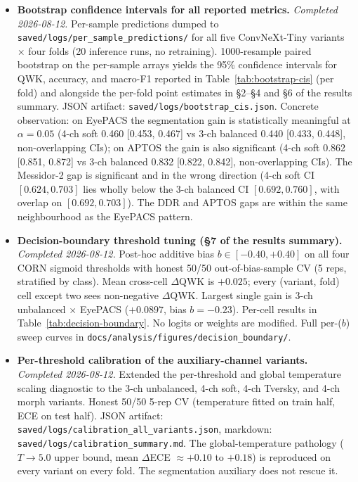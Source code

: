 \documentclass[11pt]{article}
\begin{document}
\begin{itemize}[leftmargin=*, topsep=0pt]
  \item \textbf{Bootstrap confidence intervals for all reported metrics.} \emph{Completed 2026-08-12.} Per-sample predictions dumped to \texttt{saved/logs/per\_sample\_predictions/} for all five ConvNeXt-Tiny variants $\times$ four folds (20 inference runs, no retraining). 1000-resample paired bootstrap on the per-sample arrays yields the 95\% confidence intervals for QWK, accuracy, and macro-F1 reported in Table~\ref{tab:bootstrap-cis} (per fold) and alongside the per-fold point estimates in §2--§4 and §6 of the results summary. JSON artifact: \texttt{saved/logs/bootstrap\_cis.json}. Concrete observation: on EyePACS the segmentation gain is statistically meaningful at $\alpha = 0.05$ (4-ch soft 0.460 [0.453, 0.467] vs 3-ch balanced 0.440 [0.433, 0.448], non-overlapping CIs); on APTOS the gain is also significant (4-ch soft 0.862 [0.851, 0.872] vs 3-ch balanced 0.832 [0.822, 0.842], non-overlapping CIs). The Messidor-2 gap is significant and in the wrong direction (4-ch soft CI $[0.624, 0.703]$ lies wholly below the 3-ch balanced CI $[0.692, 0.760]$, with overlap on $[0.692, 0.703]$). The DDR and APTOS gaps are within the same neighbourhood as the EyePACS pattern.
  \item \textbf{Decision-boundary threshold tuning (§7 of the results summary).} \emph{Completed 2026-08-12.} Post-hoc additive bias $b \in [-0.40, +0.40]$ on all four CORN sigmoid thresholds with honest 50/50 out-of-bias-sample CV (5 reps, stratified by class). Mean cross-cell $\Delta$QWK is $+0.025$; every (variant, fold) cell except two sees non-negative $\Delta$QWK. Largest single gain is 3-ch unbalanced $\times$ EyePACS ($+0.0897$, bias $b = -0.23$). Per-cell results in Table~\ref{tab:decision-boundary}. No logits or weights are modified. Full per-($b$) sweep curves in \texttt{docs/analysis/figures/decision\_boundary/}.
  \item \textbf{Per-threshold calibration of the auxiliary-channel variants.} \emph{Completed 2026-08-12.} Extended the per-threshold and global temperature scaling diagnostic to the 3-ch unbalanced, 4-ch soft, 4-ch Tversky, and 4-ch morph variants. Honest 50/50 5-rep CV (temperature fitted on train half, ECE on test half). JSON artifact: \texttt{saved/logs/calibration\_all\_variants.json}, markdown: \texttt{saved/logs/calibration\_summary.md}. The global-temperature pathology ($T \to 5.0$ upper bound, mean $\Delta$ECE $\approx +0.10$ to $+0.18$) is reproduced on every variant on every fold. The segmentation auxiliary does not rescue it.

\end{itemize}
\end{document}
